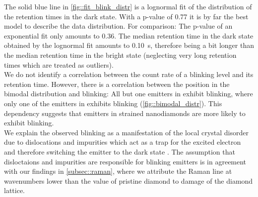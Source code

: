 	The solid blue line in \autoref{fig::fit_blink_distr} is a lognormal fit of the distribution of the retention times in the dark state.
	With a p-value of \num{0.77} it is by far the best model to describe the data distribution.
	For comparison: The p-value of an exponential fit only amounts to \num{0.36}.
	The median retention time in the dark state obtained by the lognormal fit amounts to \SI{0.10}{s}, therefore being a bit longer than the median retention time in the bright state (neglecting very long retention times which are treated as outliers).
	\\
	We do not identify a correlation between the count rate of a blinking level and its retention time.
	However, there is a correlation between the position in the bimodal distribution and blinking: 
	All but one emitters in \gh exhibit blinking, where only one of the emitters in \gv exhibits blinking (\autoref{fig::bimodal_distr}).
	This dependency suggests that emitters in strained nanodiamonds are more likely to exhibit blinking.
	\\
	We explain the observed blinking as a manifestation of the local crystal disorder due to dislocations and impurities which act as a trap for the excited electron and therefore switching the emitter to the dark state \cite{Bradac2010}.
	The assumption that disloctaions and impurities are responsible for blinking emitters is in agreement with our findings in \ref{subsec::raman}, where we attribute the Raman line at wavenumbers lower than the value of pristine diamond to damage of the diamond lattice.